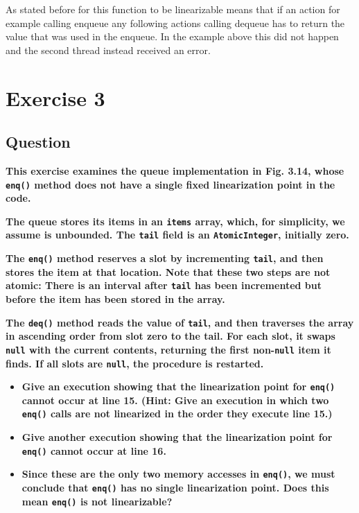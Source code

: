 \documentclass{article}
\begin{document}
As stated before for this function to be linearizable means that if an action for example calling enqueue any following actions calling dequeue has to return the value that was used in the enqueue. In the example above this did not happen and the second thread instead received an error.






\section*{Exercise 3}
\subsection*{Question}

\textbf{This exercise examines the queue implementation in Fig. \textbf{3.14}, whose \texttt{enq()} method does not have a single fixed linearization point in the code.}

\textbf{The queue stores its items in an \texttt{items} array, which, for simplicity, we assume is unbounded. The \texttt{tail} field is an \texttt{AtomicInteger}, initially zero.}

\textbf{The \texttt{enq()} method reserves a slot by incrementing \texttt{tail}, and then stores the item at that location. Note that these two steps are not atomic: There is an interval after \texttt{tail} has been incremented but before the item has been stored in the array.}

\textbf{The \texttt{deq()} method reads the value of \texttt{tail}, and then traverses the array in ascending order from slot zero to the tail. For each slot, it swaps \texttt{null} with the current contents, returning the first non-\texttt{null} item it finds. If all slots are \texttt{null}, the procedure is restarted.}

\begin{itemize}
    \item \textbf{Give an execution showing that the linearization point for \texttt{enq()} cannot occur at line \textbf{15}. (Hint: Give an execution in which two \texttt{enq()} calls are not linearized in the order they execute line \textbf{15}.)}
    \item \textbf{Give another execution showing that the linearization point for \texttt{enq()} cannot occur at line \textbf{16}.}
    \item \textbf{Since these are the only two memory accesses in \texttt{enq()}, we must conclude that \texttt{enq()} has no single linearization point. Does this mean \texttt{enq()} is not linearizable?}
\end{itemize}
\end{document}
